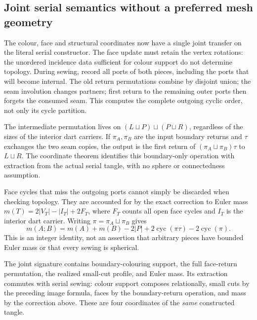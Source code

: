 \subsection{Joint serial semantics without a preferred mesh geometry}
\label{sec:joint-serial-semantics}

The colour, face and structural coordinates now have a single joint
transfer on the literal serial constructor. The face update must retain
the vertex rotations: the unordered incidence data sufficient for
colour support do not determine topology. During sewing, record all
ports of both pieces, including the ports that will become internal.
The old return permutations combine by disjoint union; the seam
involution changes partners; first return to the remaining outer ports
then forgets the consumed seam. This computes the complete outgoing
cyclic order, not only its cycle partition.

The intermediate permutation lives on $(L\sqcup P)\sqcup(P\sqcup R)$,
regardless of the sizes of the interior dart carriers. If $\pi_A,\pi_B$
are the input boundary returns and $\tau$ exchanges the two seam
copies, the output is the first return of
$(\pi_A\sqcup\pi_B)\tau$ to $L\sqcup R$. The coordinate theorem
identifies this boundary-only operation with extraction from the actual
serial tangle, with no sphere or connectedness assumption.

Face cycles that miss the outgoing ports cannot simply be discarded
when checking topology. They are accounted for by the exact correction
to Euler mass $m(T)=2|V_T|-|I_T|+2F_T$, where $F_T$ counts all open
face cycles and $I_T$ is the interior dart carrier. Writing
$\pi=\pi_A\sqcup\pi_B$ gives
\[
 m(A;B)=m(A)+m(B)-2|P|
             +2\operatorname{cyc}(\pi\tau)-2\operatorname{cyc}(\pi).
\]
This is an integer identity, not an assertion that arbitrary pieces
have bounded Euler mass or that every sewing is spherical.

The joint signature contains boundary-colouring support, the full
face-return permutation, the realized small-cut profile, and Euler mass.
Its extraction commutes with serial sewing: colour support composes
relationally, small cuts by the preceding image formula, faces by the
boundary-return operation, and mass by the correction above. These are
four coordinates of the \emph{same} constructed tangle.

